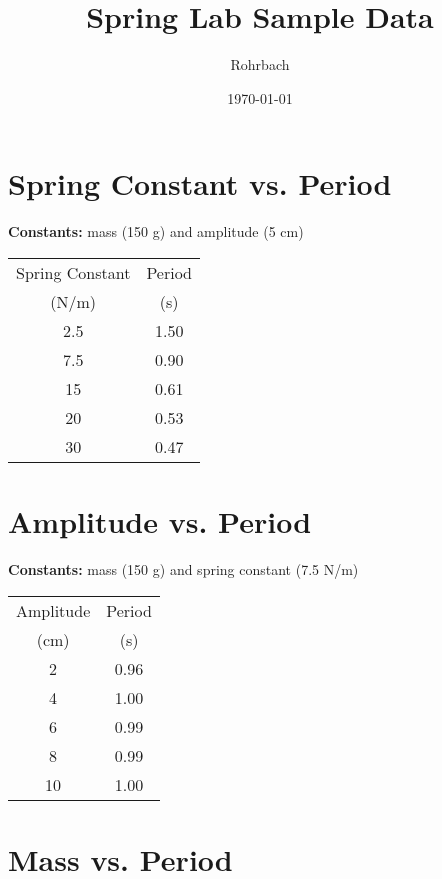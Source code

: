 \documentclass[10pt]{exam}
\title{Spring Lab Sample Data}
\author{Rohrbach}
\date{\today}
\begin{document}
\maketitle

\section{Spring Constant vs. Period}

{\bf Constants:} mass (150 g) and amplitude (5 cm)


\begin{center}
  
  \begin{tabular}{cc}
    \hline
    Spring Constant &
    Period       \\
    (N/m) & (s)  \\
    \hline
     2.5  & 1.50 \\
     7.5  & 0.90 \\
      15  & 0.61 \\
      20  & 0.53 \\
      30  & 0.47 \\
    \hline \hline 
  \end{tabular}
\end{center}



\section{Amplitude vs. Period}

{\bf Constants:} mass (150 g) and spring constant (7.5 N/m)

\begin{center}

  \begin{tabular}{cc}
    \hline
    Amplitude &
    Period      \\
    (cm) & (s)  \\
    \hline
      2  & 0.96 \\
      4  & 1.00 \\
      6  & 0.99 \\
      8  & 0.99 \\
     10  & 1.00 \\
    \hline \hline 
  \end{tabular}
\end{center}


\section{Mass vs. Period}
\end{document}
